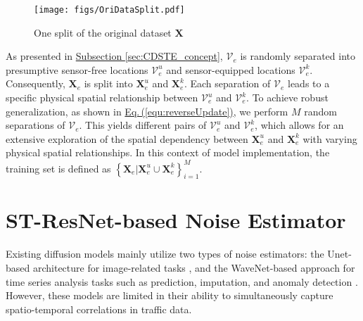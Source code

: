 \documentclass[a4paper,fleqn,12pt]{cas-sc}
\begin{document}
\begin{figure}[pos=htbp,width=7.5cm,align=\centering]
  \centering 
  \texttt{[image: figs/OriDataSplit.pdf]}
  \caption{One split of the original dataset $\boldsymbol{X}$}\label{fig:OriDataSplit}
\end{figure}

As presented in \hyperref[sec:CDSTE_concept]{Subsection \ref{sec:CDSTE_concept}}, $\boldsymbol{\mathcal{V}}_{e}$ is randomly separated into presumptive sensor-free locations $\boldsymbol{\mathcal{V}}^{u}_{e}$ and sensor-equipped locations $\boldsymbol{\mathcal{V}}^{k}_{e}$. Consequently, $\boldsymbol{X}_{e}$ is split into $\boldsymbol{X}^{u}_{e}$ and $\boldsymbol{X}^{k}_{e}$. Each separation of $\boldsymbol{\mathcal{V}}_{e}$ leads to a specific physical spatial relationship between $\boldsymbol{\mathcal{V}}^{u}_{e}$ and $\boldsymbol{\mathcal{V}}^{k}_{e}$. To achieve robust generalization, as shown in \hyperref[equ:reverseUpdate]{Eq.\,(\ref{equ:reverseUpdate})}, we perform $M$ random separations of $\boldsymbol{\mathcal{V}}_{e}$. This yields different pairs of $\boldsymbol{\mathcal{V}}^{u}_{e}$ and $\boldsymbol{\mathcal{V}}^{k}_{e}$, which allows for an extensive exploration of the spatial dependency between $\boldsymbol{X}^{u}_{e}$ and $\boldsymbol{X}^{k}_{e}$ with varying physical spatial relationships. In this context of model implementation, the training set is defined as $\left\{\boldsymbol{X}_{e} | \boldsymbol{X}^{u}_{e}\cup \boldsymbol{X}^{k}_{e}\right\}_{i=1}^{M}$. 

\section{ST-ResNet-based Noise Estimator}\label{sec:noise}
Existing diffusion models mainly utilize two types of noise estimators: the Unet-based architecture \citep{ronneberger2015u} for image-related tasks \citep{cao2022swin, saharia2022photorealistic}, and the WaveNet-based approach \citep{vandenOord2016} for time series analysis tasks such as prediction, imputation, and anomaly detection \citep{kong2021diffwave, tashiro2021csdi}. However, these models are limited in their ability to simultaneously capture spatio-temporal correlations in traffic data.
\end{document}
